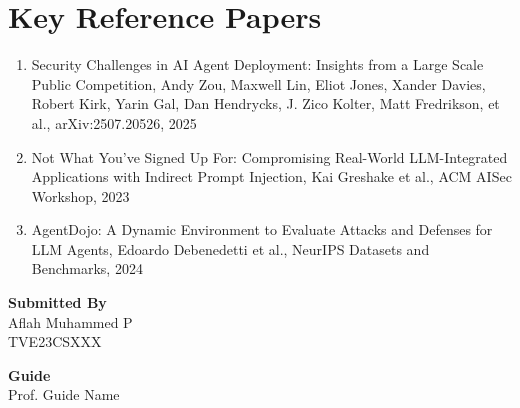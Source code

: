 \documentclass[12pt]{article}
\newcommand{\studentname}{Aflah Muhammed P}
\newcommand{\rollno}{TVE23CSXXX}
\newcommand{\guidename}{Prof. Guide Name}
\begin{document}
\section*{Key Reference Papers}
\begin{enumerate}
  \item Security Challenges in AI Agent Deployment: Insights from a Large Scale Public Competition, Andy Zou, Maxwell Lin, Eliot Jones, Xander Davies, Robert Kirk, Yarin Gal, Dan Hendrycks, J. Zico Kolter, Matt Fredrikson, et al., arXiv:2507.20526, 2025
  \item Not What You've Signed Up For: Compromising Real-World LLM-Integrated Applications with Indirect Prompt Injection, Kai Greshake et al., ACM AISec Workshop, 2023
  \item AgentDojo: A Dynamic Environment to Evaluate Attacks and Defenses for LLM Agents, Edoardo Debenedetti et al., NeurIPS Datasets and Benchmarks, 2024
\end{enumerate}
\vspace{1.5em}

\noindent\textbf{Submitted By}\\
\studentname\\
\rollno

\vspace{1em}
\noindent\textbf{Guide}\\
\guidename
\end{document}
